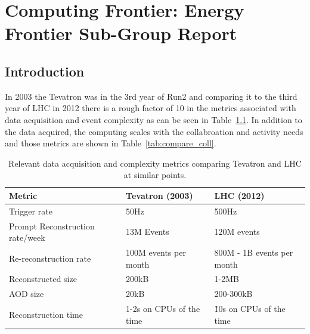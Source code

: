  
\chapter{Computing Frontier: Energy Frontier Sub-Group Report}
\label{chap:E2}


\begin{center}\begin{boldmath}



\end{boldmath}\end{center}


\section{Introduction}
\label{sec:comp-intro}

In 2003 the Tevatron was in the 3rd year of Run2 and comparing it to
the third year of LHC in 2012 there is a rough factor of 10 in the
metrics associated with data acquisition and event complexity as can
be seen in Table~\ref{tab:compare_daq}. In addition to the data
acquired, the computing scales with the collabroation and activity
needs and those metrics are shown in Table~\ref{tab:compare_coll}.

\begin{table}[t]
\begin{center}
\begin{tabular}{lll}
Metric & Tevatron (2003) & LHC (2012) \\ \hline
Trigger rate & 50Hz & 500Hz \\
Prompt Reconstruction rate/week & 13M Events & 120M events \\
Re-reconstruction rate & 100M events per month & 800M - 1B events per month \\
Reconstructed size & 200kB & 1-2MB \\
AOD size & 20kB & 200-300kB \\
Reconstruction time & 1-2s on CPUs of the time & \~ 10s on CPUs of the time \\ \hline
\end{tabular}
\caption{Relevant data acquisition and complexity metrics comparing Tevatron and LHC at similar points.}
\label{tab:compare_daq}
\end{center}
\end{table}


